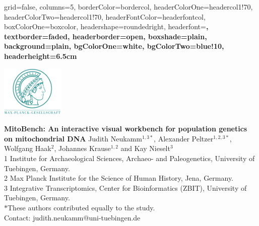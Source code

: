 \documentclass[a0paper,portrait]{baposter}
\begin{document}


\begin{poster}{
	grid=false,
	columns=5,
	borderColor=bordercol,
	headerColorOne=headercol1!70,%
	headerColorTwo=headercol1!70,%
	headerFontColor=headerfontcol,
	boxColorOne=boxcolor,
	headershape=roundedright,
	headerfont=\large\sf\bf,
	textborder=faded,%
	headerborder=open,
  	boxshade=plain,
	background=plain,%
	bgColorOne=white,
	bgColorTwo=blue!10,
	headerheight=6.5cm
}
{

	\includegraphics[width=3cm]{figures/Max-Planck-Gesellschaft.png}

}
{\Large\bf
	MitoBench: An interactive visual workbench for population genetics on mitochondrial DNA
}
{
	\vspace{1em} Judith Neukamm$^{1,3*}$, Alexander Peltzer$^{1,2,3*}$, Wolfgang Haak$^{2}$, Johannes Krause$^{1,2}$ and Kay Nieselt$^{3}$\\
	{\footnotesize 1 Institute for Archaeological Sciences, Archaeo- and Paleogenetics, University of Tuebingen, Germany.\\
	2 Max Planck Institute for the Science of Human History, Jena, Germany.\\
	3 Integrative Transcriptomics, Center for Bioinformatics (ZBIT), University of Tuebingen, Germany.\\
	$*$These authors contributed equally to the study.\\
	\vspace{1em}
	Contact: judith.neukamm@uni-tuebingen.de
	}
}
{

}
\end{poster}
\end{document}
